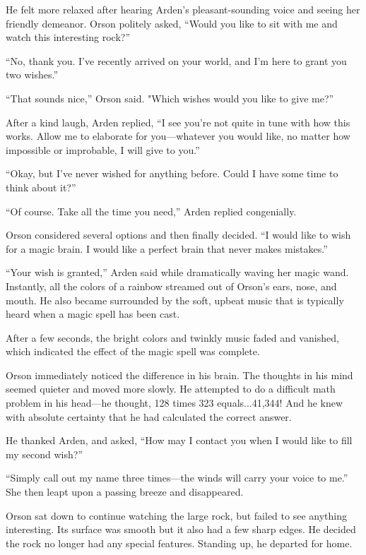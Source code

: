 He felt more relaxed after hearing Arden's pleasant-sounding voice and seeing her friendly demeanor. Orson politely asked, “Would you like to sit with me and watch this interesting rock?”

“No, thank you. I've recently arrived on your world, and I'm here to grant you two wishes.”

“That sounds nice,” Orson said. "Which wishes would you like to give me?”

After a kind laugh, Arden replied, “I see you're not quite in tune with how this works. Allow me to elaborate for you—whatever you would like, no matter how impossible or improbable, I will give to you.”

“Okay, but I've never wished for anything before. Could I have some time to think about it?”

“Of course. Take all the time you need,” Arden replied congenially.

Orson considered several options and then finally decided. “I would like to wish for a magic brain. I would like a perfect brain that never makes mistakes.”

“Your wish is granted,” Arden said while dramatically waving her magic wand. Instantly, all the colors of a rainbow streamed out of Orson's ears, nose, and mouth. He also became surrounded by the soft, upbeat music that is typically heard when a magic spell has been cast.

After a few seconds, the bright colors and twinkly music faded and vanished, which indicated the effect of the magic spell was complete.

Orson immediately noticed the difference in his brain. The thoughts in his mind seemed quieter and moved more slowly. He attempted to do a difficult math problem in his head—he thought, 128 times 323 equals...41,344! And he knew with absolute certainty that he had calculated the correct answer.

He thanked Arden, and asked, “How may I contact you when I would like to fill my second wish?”

“Simply call out my name three times—the winds will carry your voice to me.” She then leapt upon a passing breeze and disappeared.

Orson sat down to continue watching the large rock, but failed to see anything interesting. Its surface was smooth but it also had a few sharp edges. He decided the rock no longer had any special features. Standing up, he departed for home.

\timesep

